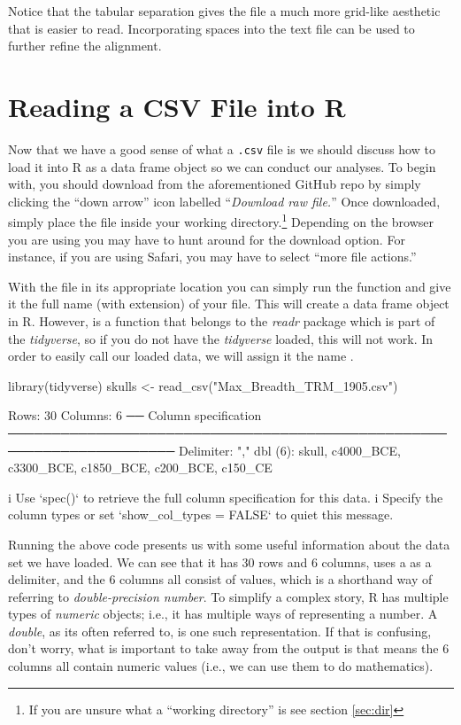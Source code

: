 \noindent Notice that the tabular separation gives the file a much more grid-like aesthetic that is easier to read. Incorporating spaces into the text file can be used to further refine the alignment.

\section{Reading a CSV File into R}

Now that we have a good sense of what a \texttt{.csv} file is we should discuss how to load it into R as a data frame object so we can conduct our analyses. To begin with, you should download  from the aforementioned GitHub repo by simply clicking the ``down arrow'' icon labelled ``\textit{Download raw file.}'' Once downloaded, simply place the file inside your working directory.\footnote{If you are unsure what a ``working directory'' is see section \ref{sec:dir}} Depending on the browser you are using you may have to hunt around for the download option. For instance, if you are using Safari, you may have to select ``more file actions.''

With the file in its appropriate location you can simply run the function  and give it the full name (with extension) of your file. This will create a data frame object in R. However,  is a function that belongs to the \textit{readr} package which is part of the \textit{tidyverse}, so if you do not have the \textit{tidyverse} loaded, this will not work. In order to easily call our loaded data, we will assign it the name .

\begin{inR}
library(tidyverse)
skulls <- read_csv("Max_Breadth_TRM_1905.csv")
\end{inR}

\begin{outR}
Rows: 30 Columns: 6                                                                          
── Column specification ─────────────────────────────────────────────────────────────────────
Delimiter: ","
dbl (6): skull, c4000_BCE, c3300_BCE, c1850_BCE, c200_BCE, c150_CE

i Use `spec()` to retrieve the full column specification for this data.
i Specify the column types or set `show_col_types = FALSE` to quiet this message.
\end{outR}

Running the above code presents us with some useful information about the data set we have loaded.  We can see that it has 30 rows and 6 columns, uses a \R{,} as a delimiter, and the 6 columns all consist of  values, which is a shorthand way of referring to \textit{double-precision number}. To simplify a complex story, R has multiple types of \textit{numeric} objects; i.e., it has multiple ways of representing a number. A \textit{double}, as its often referred to, is one such representation. If that is confusing, don't worry, what is important to take away from the output is that  means the 6 columns all contain numeric values (i.e., we can use them to do mathematics).

